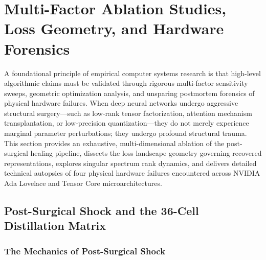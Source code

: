 \section{Multi-Factor Ablation Studies, Loss Geometry, and Hardware Forensics}
\label{sec:ablations_forensics}

A foundational principle of empirical computer systems research is that high-level algorithmic claims must be validated through rigorous multi-factor sensitivity sweeps, geometric optimization analysis, and unsparing postmortem forensics of physical hardware failures. When deep neural networks undergo aggressive structural surgery---such as low-rank tensor factorization, attention mechanism transplantation, or low-precision quantization---they do not merely experience marginal parameter perturbations; they undergo profound structural trauma. This section provides an exhaustive, multi-dimensional ablation of the post-surgical healing pipeline, dissects the loss landscape geometry governing recovered representations, explores singular spectrum rank dynamics, and delivers detailed technical autopsies of four physical hardware failures encountered across NVIDIA Ada Lovelace and Tensor Core microarchitectures.

\subsection{Post-Surgical Shock and the 36-Cell Distillation Matrix}
\label{sec:ablations_shock_matrix}

\subsubsection{The Mechanics of Post-Surgical Shock}
\label{sec:ablations_shock_mechanics}

